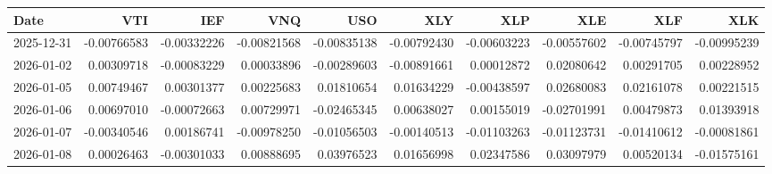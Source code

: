 \begin{tabular}{lrrrrrrrrr}
\toprule
Date & VTI & IEF & VNQ & USO & XLY & XLP & XLE & XLF & XLK \\
\midrule
2025-12-31 & -0.00766583 & -0.00332226 & -0.00821568 & -0.00835138 & -0.00792430 & -0.00603223 & -0.00557602 & -0.00745797 & -0.00995239 \\
2026-01-02 & 0.00309718 & -0.00083229 & 0.00033896 & -0.00289603 & -0.00891661 & 0.00012872 & 0.02080642 & 0.00291705 & 0.00228952 \\
2026-01-05 & 0.00749467 & 0.00301377 & 0.00225683 & 0.01810654 & 0.01634229 & -0.00438597 & 0.02680083 & 0.02161078 & 0.00221515 \\
2026-01-06 & 0.00697010 & -0.00072663 & 0.00729971 & -0.02465345 & 0.00638027 & 0.00155019 & -0.02701991 & 0.00479873 & 0.01393918 \\
2026-01-07 & -0.00340546 & 0.00186741 & -0.00978250 & -0.01056503 & -0.00140513 & -0.01103263 & -0.01123731 & -0.01410612 & -0.00081861 \\
2026-01-08 & 0.00026463 & -0.00301033 & 0.00888695 & 0.03976523 & 0.01656998 & 0.02347586 & 0.03097979 & 0.00520134 & -0.01575161 \\
\bottomrule
\end{tabular}
